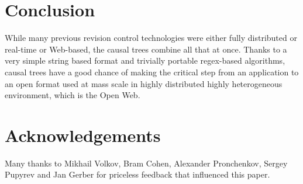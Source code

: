 \documentclass{sig-alternate}
\begin{document}
\section {Conclusion} \label{sec:conclusion}

While many previous revision control technologies were either fully distributed or real-time or Web-based, the causal trees combine all that at once.
Thanks to a very simple string based format and trivially portable regex-based algorithms, causal trees have a good chance of making the critical step from an application to an open format used at mass scale in highly distributed highly heterogeneous environment, which is the Open Web.


\section{Acknowledgements}

Many thanks to Mikhail Volkov, Bram Cohen, Alexander Pronchenkov, Sergey Pupyrev and Jan Gerber for priceless feedback that influenced this paper. \newpage

\small

\end{document}
